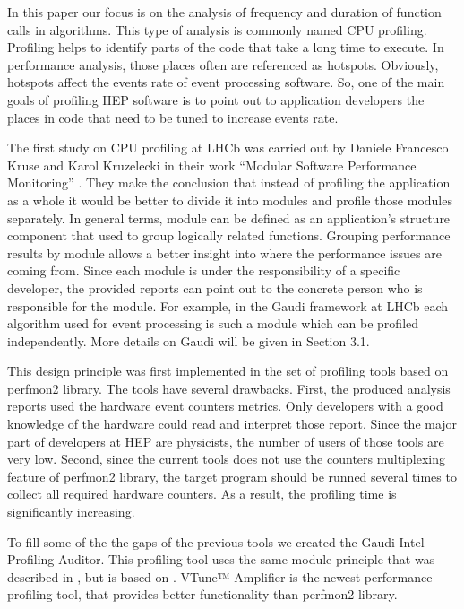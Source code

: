 \documentclass[a4paper]{jpconf}
\begin{document}
In this paper our focus is on the analysis of frequency and duration of function calls in algorithms. This type of analysis is commonly named CPU profiling. Profiling helps to identify parts of the code that take a long time to execute. In performance analysis, those places often are referenced as hotspots. Obviously,  hotspots affect the events rate of event processing software. So, one of the main goals of profiling HEP software is to point out to application developers the places in code that need to be tuned to increase events rate.

The first study on CPU profiling at LHCb was carried out by Daniele Francesco Kruse and Karol Kruzelecki in their work “Modular Software Performance Monitoring” \cite{modular}. They make the conclusion that instead of profiling the application as a whole it would be better to divide it into modules and profile those modules separately. In general terms,  module can be defined as an application’s structure component that used to group logically related functions.  Grouping performance results by module allows a better insight into where the performance issues are coming from. Since each module is under the responsibility of a specific developer,  the provided reports can point out to the concrete person who is responsible for the module. For example, in the Gaudi \cite{gaudi} framework at LHCb each algorithm used for event processing is such a module which can be profiled independently. More details on Gaudi will be given in Section 3.1. 

This design principle was first implemented in the set of profiling tools based on perfmon2 \cite{perfmon2} library.  The tools have several drawbacks. First, the produced analysis reports  used the  hardware event counters metrics. Only developers with a good knowledge of the hardware could read and interpret those report. Since the major part of developers at HEP are physicists, the number of users of those tools are very low. Second, since the current tools does not use the counters multiplexing feature of perfmon2 library, the target program should be runned several times to collect all required hardware counters. As a result, the profiling time is significantly increasing.

To fill some of the the gaps of the previous tools we created the Gaudi Intel Profiling Auditor. This profiling tool uses the same module principle that was described in \cite{modular},  but is based on \iamp \cite{vtune}. VTune™ Amplifier is the newest performance profiling tool, that provides better functionality than perfmon2 library. 
\end{document}
